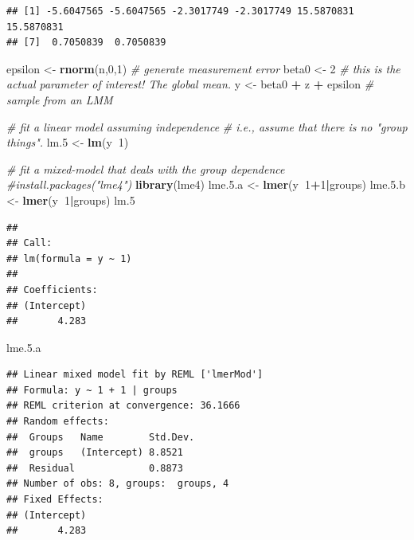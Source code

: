 \documentclass[]{book}
\newenvironment{Shaded}{\begin{snugshade}}{\end{snugshade}}
\newcommand{\CommentTok}[1]{\textcolor[rgb]{0.56,0.35,0.01}{\textit{#1}}}
\newcommand{\DecValTok}[1]{\textcolor[rgb]{0.00,0.00,0.81}{#1}}
\newcommand{\FloatTok}[1]{\textcolor[rgb]{0.00,0.00,0.81}{#1}}
\newcommand{\KeywordTok}[1]{\textcolor[rgb]{0.13,0.29,0.53}{\textbf{#1}}}
\newcommand{\NormalTok}[1]{#1}
\newcommand{\OperatorTok}[1]{\textcolor[rgb]{0.81,0.36,0.00}{\textbf{#1}}}
\newcommand{\StringTok}[1]{\textcolor[rgb]{0.31,0.60,0.02}{#1}}
\begin{document}
\begin{verbatim}
## [1] -5.6047565 -5.6047565 -2.3017749 -2.3017749 15.5870831 15.5870831
## [7]  0.7050839  0.7050839
\end{verbatim}

\begin{Shaded}
\begin{Highlighting}[]
\NormalTok{epsilon <-}\StringTok{ }\KeywordTok{rnorm}\NormalTok{(n,}\DecValTok{0}\NormalTok{,}\DecValTok{1}\NormalTok{) }\CommentTok{# generate measurement error}
\NormalTok{beta0 <-}\StringTok{ }\DecValTok{2} \CommentTok{# this is the actual parameter of interest! The global mean.}
\NormalTok{y <-}\StringTok{ }\NormalTok{beta0 }\OperatorTok{+}\StringTok{ }\NormalTok{z }\OperatorTok{+}\StringTok{ }\NormalTok{epsilon }\CommentTok{# sample from an LMM}

\CommentTok{# fit a linear model assuming independence}
\CommentTok{# i.e., assume that there is no "group things".}
\NormalTok{lm}\FloatTok{.5}\NormalTok{ <-}\StringTok{ }\KeywordTok{lm}\NormalTok{(y}\OperatorTok{~}\DecValTok{1}\NormalTok{)}

\CommentTok{# fit a mixed-model that deals with the group dependence}
\CommentTok{#install.packages("lme4")}
\KeywordTok{library}\NormalTok{(lme4)}
\NormalTok{lme.}\FloatTok{5.}\NormalTok{a <-}\StringTok{ }\KeywordTok{lmer}\NormalTok{(y}\OperatorTok{~}\DecValTok{1}\OperatorTok{+}\DecValTok{1}\OperatorTok{|}\NormalTok{groups) }
\NormalTok{lme.}\FloatTok{5.}\NormalTok{b <-}\StringTok{ }\KeywordTok{lmer}\NormalTok{(y}\OperatorTok{~}\DecValTok{1}\OperatorTok{|}\NormalTok{groups) }
\NormalTok{lm}\FloatTok{.5}
\end{Highlighting}
\end{Shaded}

\begin{verbatim}
## 
## Call:
## lm(formula = y ~ 1)
## 
## Coefficients:
## (Intercept)  
##       4.283
\end{verbatim}

\begin{Shaded}
\begin{Highlighting}[]
\NormalTok{lme.}\FloatTok{5.}\NormalTok{a }
\end{Highlighting}
\end{Shaded}

\begin{verbatim}
## Linear mixed model fit by REML ['lmerMod']
## Formula: y ~ 1 + 1 | groups
## REML criterion at convergence: 36.1666
## Random effects:
##  Groups   Name        Std.Dev.
##  groups   (Intercept) 8.8521  
##  Residual             0.8873  
## Number of obs: 8, groups:  groups, 4
## Fixed Effects:
## (Intercept)  
##       4.283
\end{verbatim}
\end{document}
